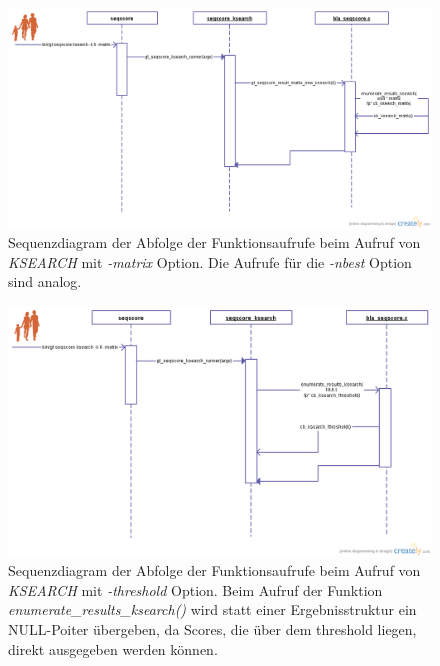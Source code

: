 \documentclass{article}
\begin{document}
\begin{center}
  \begin{figure}
    \includegraphics[width = \linewidth]{img/seqscore_seqence_fam.png}
    \caption{Sequenzdiagram der Abfolge der Funktionsaufrufe beim Aufruf von \emph{KSEARCH} mit \emph{-matrix} Option. Die Aufrufe für die \emph{-nbest} Option sind analog.}
    \label{manbes}
  \end{figure}
\end{center}

\begin{center}
  \begin{figure}
    \includegraphics[width = \linewidth]{img/seqscore_sequence_fam_thresh.png}
    \caption{Sequenzdiagram der Abfolge der Funktionsaufrufe beim Aufruf von  \emph{KSEARCH} mit \emph{-threshold} Option. Beim Aufruf der Funktion \emph{enumerate\_results\_ksearch()} wird statt einer Ergebnisstruktur ein NULL-Poiter übergeben, da Scores, die über dem threshold liegen, direkt ausgegeben werden können.}
    \label{thresh}
  \end{figure}
\end{center}
\end{document}
